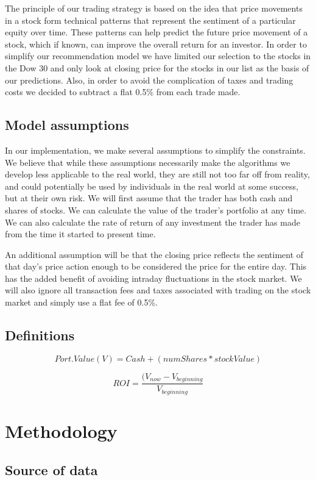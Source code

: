\documentclass{article}
\begin{document}
The principle of our trading strategy is based on the idea that price movements in a stock form technical patterns that represent the sentiment of a particular equity over time. These patterns can help predict the future price movement of a stock, which if known, can improve the overall return for an investor.  In order to simplify our recommendation model we have limited our selection to the stocks in the Dow 30 and only look at closing price for the stocks in our list as the basis of our predictions.  Also, in order to avoid the complication of taxes and trading costs we decided to subtract a flat 0.5\% from each trade made.

\subsection{Model assumptions}
In our implementation, we make several assumptions to simplify the constraints. We believe that while these assumptions necessarily make the algorithms we develop less applicable to the real world, they are still not too far off from reality, and could potentially be used by individuals in the real world at some success, but at their own risk. We will first assume that the trader has both cash and shares of stocks. We can calculate the value of the trader’s portfolio at any time. We can also calculate the rate of return of any investment the trader has made from the time it started to present time.

An additional assumption will be that the closing price reflects the sentiment of that day’s price action enough to be considered the price for the entire day. This has the added benefit of avoiding intraday fluctuations in the stock market. We will also ignore all transaction fees and taxes associated with trading on the stock market and simply use a flat fee of 0.5\%.

\subsection{Definitions}

$$
Port.Value (V) = Cash + (num Shares*stock Value)
$$

$$
ROI = \frac{(V_{now} - V_{beginning}}{V_{beginning}}
$$

\section{Methodology}

\subsection{Source of data}
\end{document}
